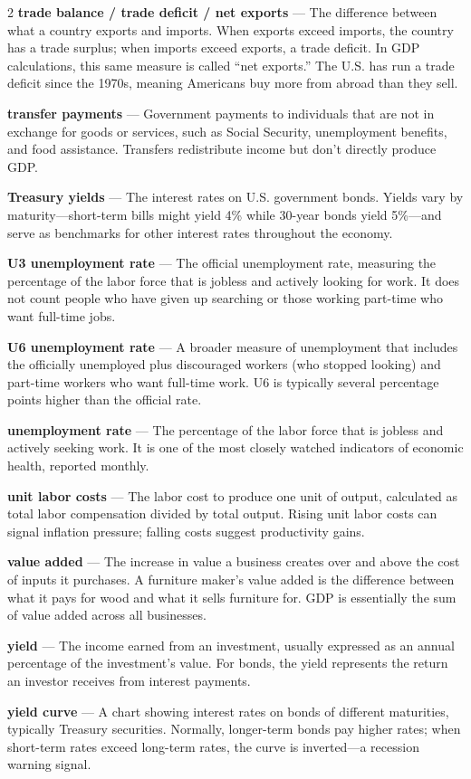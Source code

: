 \begin{multicols}{2}
\textbf{trade balance / trade deficit / net exports} --- The difference between what a country exports and imports. When exports exceed imports, the country has a trade surplus; when imports exceed exports, a trade deficit. In GDP calculations, this same measure is called ``net exports.'' The U.S. has run a trade deficit since the 1970s, meaning Americans buy more from abroad than they sell.

\textbf{transfer payments} --- Government payments to individuals that are not in exchange for goods or services, such as Social Security, unemployment benefits, and food assistance. Transfers redistribute income but don't directly produce GDP.

\textbf{Treasury yields} --- The interest rates on U.S. government bonds. Yields vary by maturity---short-term bills might yield 4\% while 30-year bonds yield 5\%---and serve as benchmarks for other interest rates throughout the economy.

\textbf{U3 unemployment rate} --- The official unemployment rate, measuring the percentage of the labor force that is jobless and actively looking for work. It does not count people who have given up searching or those working part-time who want full-time jobs.

\textbf{U6 unemployment rate} --- A broader measure of unemployment that includes the officially unemployed plus discouraged workers (who stopped looking) and part-time workers who want full-time work. U6 is typically several percentage points higher than the official rate.

\textbf{unemployment rate} --- The percentage of the labor force that is jobless and actively seeking work. It is one of the most closely watched indicators of economic health, reported monthly.

\textbf{unit labor costs} --- The labor cost to produce one unit of output, calculated as total labor compensation divided by total output. Rising unit labor costs can signal inflation pressure; falling costs suggest productivity gains.

\textbf{value added} --- The increase in value a business creates over and above the cost of inputs it purchases. A furniture maker's value added is the difference between what it pays for wood and what it sells furniture for. GDP is essentially the sum of value added across all businesses.

\textbf{yield} --- The income earned from an investment, usually expressed as an annual percentage of the investment's value. For bonds, the yield represents the return an investor receives from interest payments.

\textbf{yield curve} --- A chart showing interest rates on bonds of different maturities, typically Treasury securities. Normally, longer-term bonds pay higher rates; when short-term rates exceed long-term rates, the curve is inverted---a recession warning signal.

\end{multicols}
